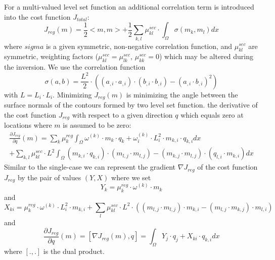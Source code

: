 For a multi-valued level set function an additional correlation term is introduced into the cost function $J_{total}$:
\begin{equation}\label{EQU:REG:1c}
J_{reg}(m)  =  \frac{1}{2} < m,   m > + \frac{1}{2}  \sum_{k,l} \mu_{kl}^{sec} \cdot \int_{\Omega} \sigma(m_k,m_l) dx
\end{equation} 
where $sigma$ is a given symmetric, non-negative correlation function, and $\mu_{kl}^{sec}$ are symmetric, weighting factors 
($\mu_{kl}^{sec} = \mu_{lk}^{sec}$, $\mu_{kk}^{sec}=0$) which may 
be altered during the inversion. We use the correlation function 
\begin{equation}\label{EQU:REG:4}
 \sigma(a,b) = \frac{L^2}{2} \cdot ( ( a_{,i} \cdot a_{,i}) \cdot ( b_{,i} \cdot b_{,i}) -   ( a_{,i} \cdot b_{,i})^2 )
\end{equation} 
with $L=L_i \cdot L_i$. Minimizing $J_{reg}(m)$ is minimizing the angle between the surface normals of the contours formed by
two level set function. the derivative of the cost function $J_{reg}$ with respect to a given direction $q$  which equals zero at locations
where $m$ is assumed to be zero:
\begin{equation}\label{EQU:REG:5}
\begin{array}{ll}
\displaystyle{\frac{ \partial J_{reg}}{\partial q}(m)} =
\displaystyle{\sum_{k} \mu^{reg}_k \int_{\Omega} \omega^{(k)} \cdot m_k \cdot q_k  + \omega^{(k)}_i \cdot L_i^2 \cdot m_{k,i} \cdot q_{k,i} dx } \\
+ \displaystyle{\sum_{k,l} \mu_{kl}^{sec} \cdot {L^2}  \int_{\Omega}  ( m_{k,i} \cdot q_{k,i}) \cdot ( m_{l,j} \cdot m_{l,j}) -   ( m_{k,j} \cdot m_{l,j}) \cdot  ( q_{l,i} \cdot m_{k,i}) } dx 
\end{array}
\end{equation} 
Similar to the single-case we can represent  
the gradient $\nabla J_{reg}$ of the cost function $J_{reg}$ by the pair of values $(Y,X)$ where we set   
\begin{equation}\label{EQU:REG:6}
Y_k= \mu^{reg}_k  \cdot \omega^{(k)} \cdot m_k
\end{equation} 
and 
\begin{equation}\label{EQU:REG:6b}
X_{ki} = \mu^{reg}_k \cdot  \omega^{(k)} \cdot L_i^2 \cdot m_{k,i} +
\sum_{l} \mu_{kl}^{sec} \cdot {L^2} \cdot ( ( m_{l,j} \cdot m_{l,j}) \cdot m_{k,i}  -   ( m_{l,j} \cdot m_{k,j}) \cdot m_{l,i} ) 
\end{equation} 
and 
\begin{equation}\label{EQU:REG:7}
\frac{ \partial J_{reg}}{\partial q}(m) = [ \nabla J_{reg}(m), q ] =
\int_{\Omega} Y_j  \cdot q_j  + X_{ki}  \cdot q_{k,i} dx
\end{equation} 
where $[.,.]$ is the dual product.

